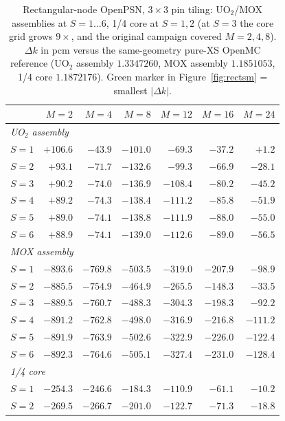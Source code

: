 \documentclass[11pt,a4paper]{article}
\begin{document}
\begin{table}[h]
\centering
\caption{Rectangular-node OpenPSN, $3\times3$ pin tiling: UO$_2$/MOX
assemblies at $S{=}1\ldots6$, 1/4 core at $S{=}1,2$ (at $S{=}3$ the core
grid grows $9\times$, and the original campaign covered $M{=}2,4,8$).
$\Delta k$ in pcm
versus the same-geometry pure-XS OpenMC reference (UO$_2$ assembly
$1.3347260$, MOX assembly $1.1851053$, 1/4 core $1.1872176$). Green
marker in Figure~\ref{fig:rectsm} = smallest $|\Delta k|$.}
\label{tab:rectsm}
\small
\begin{tabular}{l|rrrrrr}
\toprule
 & $M{=}2$ & $M{=}4$ & $M{=}8$ & $M{=}12$ & $M{=}16$ & $M{=}24$ \\
\midrule
\multicolumn{7}{l}{\emph{UO$_2$ assembly}}\\
$S{=}1$ & $+106.6$ & $-43.9$ & $-101.0$ & $-69.3$ & $-37.2$ & $+1.2$ \\
$S{=}2$ & $+93.1$ & $-71.7$ & $-132.6$ & $-99.3$ & $-66.9$ & $-28.1$ \\
$S{=}3$ & $+90.2$ & $-74.0$ & $-136.9$ & $-108.4$ & $-80.2$ & $-45.2$ \\
$S{=}4$ & $+89.2$ & $-74.3$ & $-138.4$ & $-111.2$ & $-85.8$ & $-51.9$ \\
$S{=}5$ & $+89.0$ & $-74.1$ & $-138.8$ & $-111.9$ & $-88.0$ & $-55.0$ \\
$S{=}6$ & $+88.9$ & $-74.1$ & $-139.0$ & $-112.6$ & $-89.0$ & $-56.5$ \\
\midrule
\multicolumn{7}{l}{\emph{MOX assembly}}\\
$S{=}1$ & $-893.6$ & $-769.8$ & $-503.5$ & $-319.0$ & $-207.9$ & $-98.9$ \\
$S{=}2$ & $-885.5$ & $-754.9$ & $-464.9$ & $-265.5$ & $-148.3$ & $-33.5$ \\
$S{=}3$ & $-889.5$ & $-760.7$ & $-488.3$ & $-304.3$ & $-198.3$ & $-92.2$ \\
$S{=}4$ & $-891.2$ & $-762.8$ & $-498.0$ & $-316.9$ & $-216.8$ & $-111.2$ \\
$S{=}5$ & $-891.9$ & $-763.9$ & $-502.6$ & $-322.9$ & $-226.0$ & $-122.4$ \\
$S{=}6$ & $-892.3$ & $-764.6$ & $-505.1$ & $-327.4$ & $-231.0$ & $-128.4$ \\
\midrule
\multicolumn{7}{l}{\emph{1/4 core}}\\
$S{=}1$ & $-254.3$ & $-246.6$ & $-184.3$ & $-110.9$ & $-61.1$ & $-10.2$ \\
$S{=}2$ & $-269.5$ & $-266.7$ & $-201.0$ & $-122.7$ & $-71.3$ & $-18.8$ \\
\bottomrule
\end{tabular}
\end{table}
\end{document}
